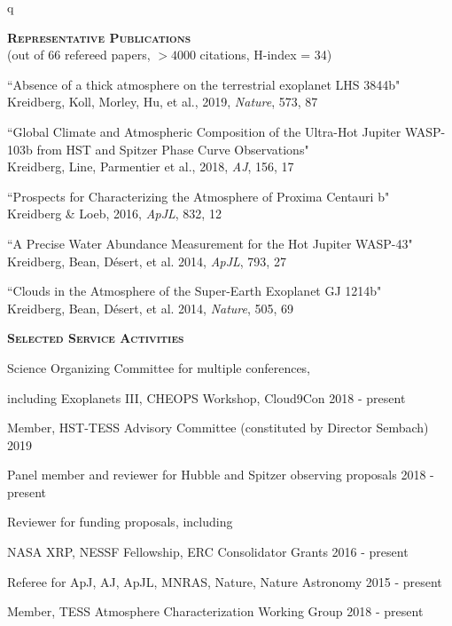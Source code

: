 q\documentclass[12pt,letterpaper]{article}
\begin{document}
\textbf{\textsc{Representative Publications}} \\
(out of 66 refereed papers, $>4000$ citations, H-index = 34)
\begin{compactenum}
\item ``Absence of a thick atmosphere on the terrestrial exoplanet LHS 3844b"\\ 
Kreidberg, Koll, Morley, Hu, et al., 2019, \textit{Nature}, 573, 87
                                                                                
\item ``Global Climate and Atmospheric Composition of the Ultra-Hot Jupiter WASP-103b from HST and Spitzer Phase Curve Observations"\\
Kreidberg, Line, Parmentier et al., 2018, \textit{AJ}, 156, 17

\item ``Prospects for Characterizing the Atmosphere of Proxima Centauri b"\\
Kreidberg \& Loeb, 2016, \textit{ApJL}, 832, 12 

\item ``A Precise Water Abundance Measurement for the Hot Jupiter WASP-43"\\
Kreidberg, Bean, D\'esert, et al. 2014, \textit{ApJL}, 793, 27

\item ``Clouds in the Atmosphere of the Super-Earth Exoplanet GJ 1214b"\\
Kreidberg, Bean, D\'esert, et al. 2014, \textit{Nature}, 505, 69

\end{compactenum}


\vspace{3mm}
\textbf{\textsc{Selected Service Activities}} 
\begin{compactitem}
    \item Science Organizing Committee for multiple conferences, 
            \begin{sloppypar}
            including Exoplanets III, CHEOPS Workshop, Cloud9Con \hfill 2018 - present
            \end{sloppypar}
    \item Member, HST-TESS Advisory Committee (constituted by Director Sembach) \hfill 2019
    \item Panel member and reviewer for Hubble and Spitzer observing proposals \hfill 2018 - present
    \item Reviewer for funding proposals, including
            \begin{sloppypar}
            NASA XRP, NESSF Fellowship, ERC Consolidator Grants \hfill 2016 - present
            \end{sloppypar}
    \item Referee for ApJ, AJ, ApJL, MNRAS, Nature, Nature Astronomy \hfill 2015 - present
    \item {Member, TESS Atmosphere Characterization Working Group \hfill 2018 - present}
\end{compactitem}
\vspace{7mm}
\end{document}
